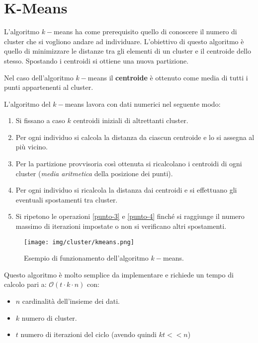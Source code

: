 \section{K-Means}
L'algoritmo $k-$means ha come prerequisito quello di conoscere il numero di
cluster che si vogliono andare ad individuare. L'obiettivo di questo algoritmo è
quello di minimizzare le distanze tra gli elementi di un cluster e il centroide
dello stesso. Spostando i centroidi si ottiene una nuova partizione.
\begin{definizione}
      Nel caso dell'algoritmo $k-$means il \textbf{centroide} è ottenuto come
      media di tutti i punti appartenenti al cluster.
\end{definizione}
L'algoritmo del $k-$means lavora con dati numerici nel seguente modo:
\begin{enumerate}
      \item Si fissano a caso $k$ centroidi iniziali di altrettanti cluster.
      \item Per ogni individuo si calcola la distanza da ciascun centroide e lo
            si assegna al più vicino.
      \item \label{punto-3} Per la partizione provvisoria così ottenuta si
            ricalcolano i centroidi di ogni cluster (\textit{media aritmetica}
            della posizione dei punti).
      \item \label{punto-4} Per ogni individuo si ricalcola la distanza dai
            centroidi e si effettuano gli eventuali spostamenti tra cluster.
      \item Si ripetono le operazioni \ref{punto-3} e \ref{punto-4} finché si
            raggiunge il numero massimo di iterazioni impostate o non si
            verificano altri spostamenti.
\end{enumerate}
\begin{figure}[!ht]
      \centering
      \texttt{[image: img/cluster/kmeans.png]}
      \caption{Esempio di funzionamento dell'algoritmo $k-$means.}
      \label{img:k-means}
\end{figure}
Questo algoritmo è molto semplice da implementare e richiede un tempo di calcolo
pari a: $\mathcal{O}(t \cdot k \cdot n)$ con:
\begin{itemize}
      \item $n$ cardinalità dell'insieme dei dati.
      \item $k$ numero di cluster.
      \item $t$ numero di iterazioni del ciclo (avendo quindi $kt << n$)
\end{itemize}
